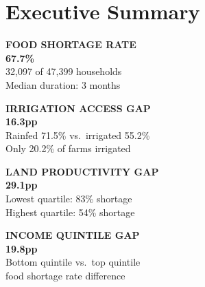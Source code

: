 \documentclass[11pt,a4paper]{article}
\begin{document}
\setcounter{page}{2}

\section{Executive Summary}

\noindent%
\begin{minipage}[t]{0.475\linewidth}
\begin{kpibox}
{\footnotesize\bfseries\color{rhoGray}FOOD SHORTAGE RATE}\\[5pt]
{\fontsize{26}{30}\selectfont\bfseries\color{rhoRed}67.7\%}\\[4pt]
{\small\color{rhoCharcoal}32,097 of 47,399 households\\
Median duration: 3 months}
\end{kpibox}
\end{minipage}\hfill%
\begin{minipage}[t]{0.475\linewidth}
\begin{kpibox}
{\footnotesize\bfseries\color{rhoGray}IRRIGATION ACCESS GAP}\\[5pt]
{\fontsize{26}{30}\selectfont\bfseries\color{rhoRed}16.3pp}\\[4pt]
{\small\color{rhoCharcoal}Rainfed 71.5\% vs.\ irrigated 55.2\%\\
Only 20.2\% of farms irrigated}
\end{kpibox}
\end{minipage}

\vspace{5pt}

\noindent%
\begin{minipage}[t]{0.475\linewidth}
\begin{kpibox}
{\footnotesize\bfseries\color{rhoGray}LAND PRODUCTIVITY GAP}\\[5pt]
{\fontsize{26}{30}\selectfont\bfseries\color{rhoRed}29.1pp}\\[4pt]
{\small\color{rhoCharcoal}Lowest quartile: 83\% shortage\\
Highest quartile: 54\% shortage}
\end{kpibox}
\end{minipage}\hfill%
\begin{minipage}[t]{0.475\linewidth}
\begin{kpibox}
{\footnotesize\bfseries\color{rhoGray}INCOME QUINTILE GAP}\\[5pt]
{\fontsize{26}{30}\selectfont\bfseries\color{rhoRed}19.8pp}\\[4pt]
{\small\color{rhoCharcoal}Bottom quintile vs.\ top quintile\\
food shortage rate difference}
\end{kpibox}
\end{minipage}
\end{document}
